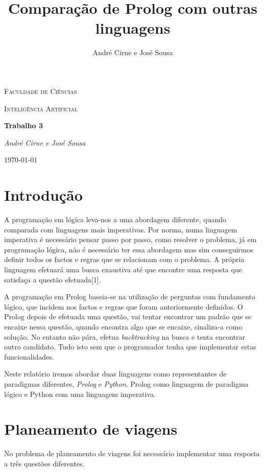 \documentclass[12pt,a4paper]{article}
\author{André Cirne e José Sousa}
\title{Comparação de Prolog com outras linguagens}
\begin{document}
\begin{titlepage}
	\centering
	{\scshape\LARGE Faculdade de Ciências \par}
	\vspace{1cm}
	{\scshape\Large Inteligência Artificial\par}
	\vspace{1.5cm}
	{\huge\bfseries Trabalho 3\par}
	\vspace{2cm}
	{\Large\itshape André Cirne e José Sousa\par}
	\vfill

	{\large \today\par}
\end{titlepage}

\tableofcontents
\section{Introdução}
A programação em lógica leva-nos a uma abordagem diferente, quando comparada com linguagens mais imperativas. Por norma, numa linguagem imperativa é necessário pensar passo por passo, como resolver o problema, já em programação lógica, não é necessário ter essa abordagem mas sim conseguirmos definir todos os factos e regras que se relacionam com o problema. A própria linguagem efetuará uma busca exaustiva até que encontre uma resposta que satisfaça a questão efetuada[1].

A programação em Prolog baseia-se na utilização de perguntas com fundamento lógico, que incidem nos factos e regras que foram anteriormente definidos. O Prolog depois de efetuada uma questão, vai tentar encontrar um padrão que se encaixe nessa questão, quando encontra algo que se encaixe, sinaliza-a como solução. No entanto não pára, efetua \textit{backtracking} na busca e tenta encontrar outro candidato. Tudo isto sem que o programador tenha que implementar estas funcionalidades.

Neste relatório iremos abordar duas linguagens como representantes de paradigmas diferentes, \textit{Prolog} e \textit{Python}. Prolog como linguagem de paradigma lógico e Python com uma linguagem imperativa.

\section{Planeamento de viagens}
No problema de planeamento de viagens foi necessário implementar uma resposta a três questões diferentes. 
\end{document}
